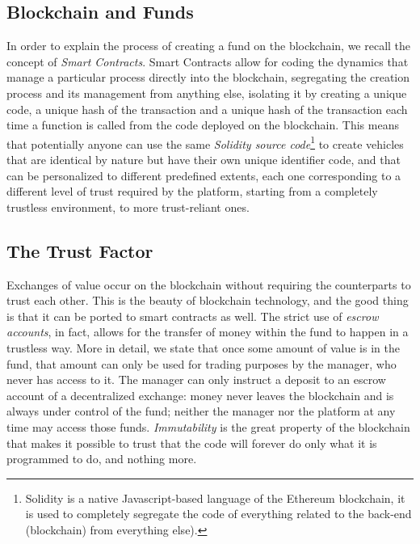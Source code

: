 \documentclass[9pt,oneside]{amsart}
\begin{document}
\begin{multicols}{2}
\section{Blockchain and Funds}\label{ch:conventions}

In order to explain the process of creating a fund on the blockchain, we recall the concept of \textit{Smart Contracts}. Smart Contracts allow for coding the dynamics that manage a particular process directly into the blockchain, segregating the creation process and its management from anything else, isolating it by creating a unique code, a unique hash of the transaction and a unique hash of the transaction each time a function is called from the code deployed on the blockchain. This means that potentially anyone can use the same \textit{Solidity source code}\footnote{Solidity is a native Javascript-based language of the Ethereum blockchain, it is used to completely segregate the code of everything related to the back-end (blockchain) from everything else).} to create vehicles that are identical by nature but have their own unique identifier code, and that can be personalized to different predefined extents, each one corresponding to a different level of trust required by the platform, starting from a completely trustless environment, to more trust-reliant ones.

\subsection{The Trust Factor} \label{ch:transaction}

Exchanges of value occur on the blockchain without requiring the counterparts to trust each other. This is the beauty of blockchain technology, and the good thing is that it can be ported to smart contracts as well. The strict use of \textit{escrow accounts}, in fact, allows for the transfer of money within the fund to happen in a trustless way.
More in detail, we state that once some amount of value is in the fund, that amount can only be used for trading purposes by the manager, who never has access to it. The manager can only instruct a deposit to an escrow account of a decentralized exchange: money never leaves the blockchain and is always under control of the fund; neither the manager nor the platform at any time may access those funds. \textit{Immutability} is the great property of the blockchain that makes it possible to trust that the code will forever do only what it is programmed to do, and nothing more.


\end{multicols}
\end{document}
